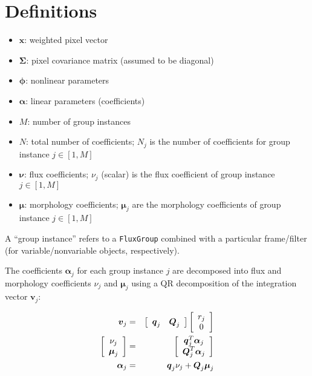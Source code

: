 \documentclass{amsart}
\newcommand{\bm}[1]{\ensuremath{\boldsymbol{#1}}}
\begin{document}
\section{Definitions}

\begin{itemize}
\item $\bm{x}$: weighted pixel vector
\item $\bm{\Sigma}$: pixel covariance matrix (assumed to be diagonal)
\item $\bm{\phi}$: nonlinear parameters
\item $\bm{\alpha}$: linear parameters (coefficients)
\item $M$: number of group instances
\item $N$: total number of coefficients; $N_j$ is the number of
  coefficients for group instance $j \in [1,M]$
\item $\bm{\nu}$: flux coefficients; $\nu_j$ (scalar) is the flux coefficient of
  group instance $j \in [1,M]$
\item $\bm{\mu}$: morphology coefficients; $\bm{\mu}_j$ are the morphology
  coefficients of group instance $j \in [1,M]$
\end{itemize}

A ``group instance'' refers to a \texttt{FluxGroup} combined with a
particular frame/filter (for variable/nonvariable objects,
respectively).

The coefficients $\bm{\alpha}_j$ for each group instance $j$ are decomposed
into flux and morphology coefficients $\nu_j$ and $\bm{\mu}_j$ using a QR
decomposition of the integration vector $\bm{v}_j$:

\begin{eqnarray}
  \bm{v}_j &=& \left[\begin{array}{ c c }
      \bm{q}_j & \bm{Q}_j
    \end{array}\right]
  \left[\begin{array}{ c }
      r_j \\
      0
    \end{array}\right] \\
  \left[\begin{array}{ c }
      \nu_j \\
      \bm{\mu}_j
    \end{array}\right] &=&
  \left[\begin{array}{ c }
      \bm{q}_j^T \bm{\alpha}_j \\
      \bm{Q}_j^T \bm{\alpha}_j
    \end{array}\right] \\
  \bm{\alpha}_j &=& \bm{q}_j \nu_j + \bm{Q}_j \bm{\mu}_j
\end{eqnarray}
\end{document}
